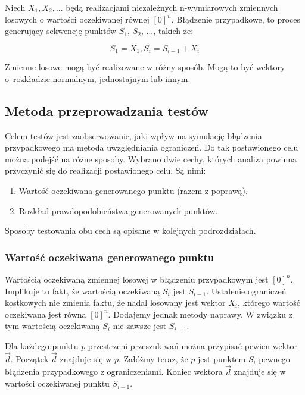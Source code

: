 \documentclass{mini}
\begin{document}
Niech $ X_1, X_2, ... $ będą realizacjami niezależnych n-wymiarowych zmiennych losowych o wartości oczekiwanej równej $ [0]^n $. Błądzenie przypadkowe, to proces generujący sekwencję punktów $S_1$, $S_2$, ..., takich że:

\begin{equation}
S_1 = X_1, S_i=S_{i-1}+X_i
\end{equation}

Zmienne losowe mogą być realizowane w różny sposób. Mogą to być wektory o~rozkładzie normalnym, jednostajnym lub innym.

\subsection{Metoda przeprowadzania testów}
\hspace{3,4ex}Celem testów jest zaobserwowanie, jaki wpływ na symulację błądzenia przypadkowego ma metoda uwzględniania ograniczeń. Do tak postawionego celu można podejść na różne sposoby. Wybrano dwie cechy, których analiza powinna przyczynić się do realizacji postawionego celu. Są nimi:
\begin{enumerate}
\item Wartość oczekiwana generowanego punktu (razem z poprawą).
\item Rozkład prawdopodobieństwa generowanych punktów.
\end{enumerate}

Sposoby testowania obu cech są opisane w kolejnych podrozdziałach.

\subsubsection{Wartość oczekiwana generowanego punktu}
\hspace{3,4ex}Wartością oczekiwaną zmiennej losowej w błądzeniu przypadkowym jest $[0]^n$. Implikuje to fakt, że wartością oczekiwaną $S_i$ jest $S_{i-1}$. Ustalenie ograniczeń kostkowych nie zmienia faktu, że nadal losowany jest wektor $X_i$, którego wartość oczekiwana jest równa $[0]^n$. Dodajemy jednak metody naprawy. W związku z tym wartością oczekiwaną $S_i$ nie zawsze jest $S_{i-1}$.

Dla każdego punktu $p$ przestrzeni przeszukiwań można przypisać pewien wektor $\overrightarrow{d}$. Początek $\overrightarrow{d}$ znajduje się w $p$. Załóżmy teraz, że $p$ jest punktem $S_i$ pewnego błądzenia przypadkowego z ograniczeniami. Koniec wektora $\overrightarrow{d}$ znajduje się w wartości oczekiwanej punktu $S_{i+1}$.
\end{document}
